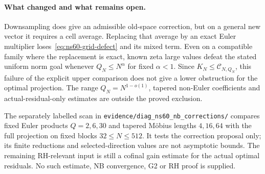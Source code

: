 \paragraph{What changed and what remains open.}
Downsampling does give an admissible old-space correction, but on a
general new vector it requires a cell average. Replacing that average
by an exact Euler multiplier loses~\eqref{eq:ns60-grid-defect} and its
mixed term. Even on a compatible family where the replacement is exact,
known zeta large values defeat the stated uniform norm goal whenever
$Q_N\leq N^\alpha$ for fixed $\alpha<1$.
Since $K_N\leq\mathcal C_{N,Q_N}$, this failure of the explicit upper
comparison does not give a lower obstruction for the optimal projection.
The range $Q_N=N^{1-o(1)}$, tapered non-Euler coefficients and
actual-residual-only estimates are outside the proved exclusion.

The separately labelled scan in
\texttt{evidence/diag\_ns60\_nb\_corrections/} compares fixed Euler
products $Q=2,6,30$ and tapered M\"obius lengths $4,16,64$ with the full
projection on fixed blocks $32\leq N\leq512$. It tests the correction
proposal only; its finite reductions and selected-direction values are
not asymptotic bounds. The remaining RH-relevant input is still a
cofinal gain estimate for the actual optimal residuals. No such estimate,
NB convergence, G2 or RH proof is supplied.

